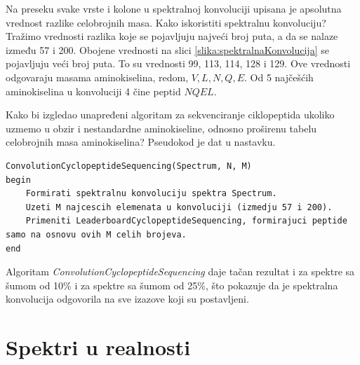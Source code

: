 \noindent Na preseku svake vrste i kolone u spektralnoj konvoluciji upisana je apsolutna vrednost razlike celobrojnih masa. Kako iskoristiti spektralnu konvoluciju? Tražimo vrednosti razlika koje se pojavljuju najveći broj puta, a da se nalaze između 57 i 200. Obojene vrednosti na slici \ref{slika:spektralnaKonvolucija} se pojavljuju veći broj puta. To su vrednosti 99, 113, 114, 128 i 129. Ove vrednosti odgovaraju masama aminokiselina, redom, $V, L, N, Q, E $. Od 5 najčešćih aminokiselina u konvoluciji 4 čine peptid $NQEL$.

Kako bi izgledao unapređeni algoritam za sekvenciranje ciklopeptida ukoliko uzmemo u obzir i nestandardne aminokiseline, odnosno proširenu tabelu celobrojnih masa aminokiselina? Pseudokod je dat u nastavku.
\begin{lstlisting}
ConvolutionCyclopeptideSequencing(Spectrum, N, M)
begin
	Formirati spektralnu konvoluciju spektra Spectrum.
	Uzeti M najcescih elemenata u konvoluciji (izmedju 57 i 200).
	Primeniti LeaderboardCyclopeptideSequencing, formirajuci peptide samo na osnovu ovih M celih brojeva.
end
\end{lstlisting}

Algoritam  \textit{ConvolutionCyclopeptideSequencing} daje tačan rezultat i za spektre sa šumom od 10\% i za spektre sa šumom od 25\%, što pokazuje da je spektralna konvolucija odgovorila na sve izazove koji su postavljeni.

\section{Spektri u realnosti} \label{realnost}


